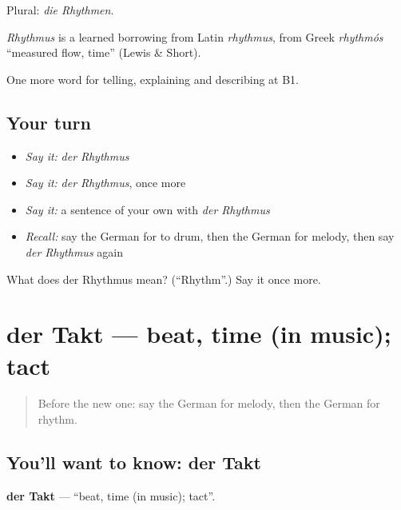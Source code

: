 Plural: \emph{die Rhythmen}.

\begin{cousinweb}
\emph{Rhythmus} is a learned borrowing from Latin \emph{rhythmus}, from Greek \emph{rhythmós} \textquotedblleft{}measured flow, time\textquotedblright{} (Lewis \& Short).
\end{cousinweb}

\begin{grammarlens}[title={What you've built}]
One more word for telling, explaining and describing at B1.
\end{grammarlens}

\subsection*{Your turn}
\begin{itemize}
\raggedright
  \item \emph{Say it:} \emph{der Rhythmus}
  \item \emph{Say it:} \emph{der Rhythmus}, once more
  \item \emph{Say it:} a sentence of your own with \emph{der Rhythmus}
  \item \emph{Recall:} say the German for to drum, then the German for melody, then say \emph{der Rhythmus} again
\end{itemize}

\begin{tcolorbox}[breakable,colback=teal!4,colframe=teal!35!black,title={Before you move on}]
What does der Rhythmus mean? (\textquotedblleft{}Rhythm\textquotedblright{}.) Say it once more.
\end{tcolorbox}
\section[der Takt]{der Takt — beat, time (in music); tact}

\label{lesson:GE-C514-takt}



\begin{quote}
Before the new one: say the German for melody, then the German for rhythm.
\end{quote}

\subsection*{You'll want to know: der Takt}
\textbf{der Takt} — \textquotedblleft{}beat, time (in music); tact\textquotedblright{}.

